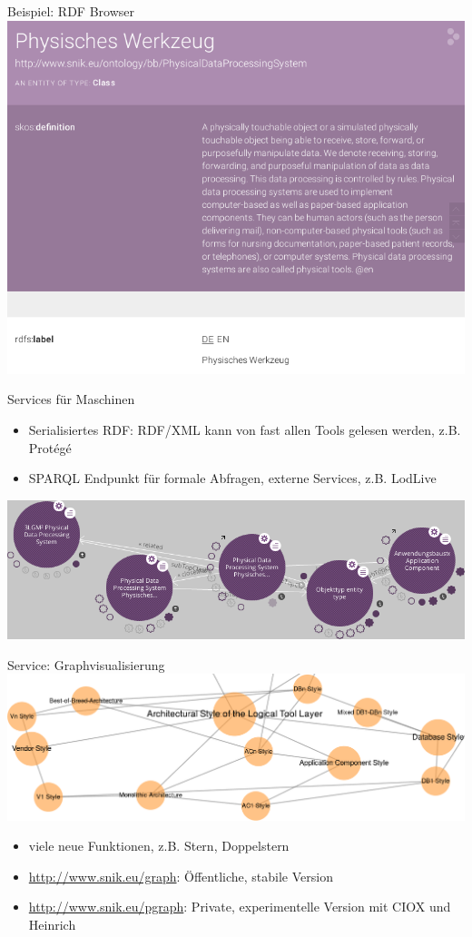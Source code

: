 \documentclass{beamer}
\begin{document}
\begin{frame}{Beispiel: RDF Browser}
\centering\includegraphics[height=0.8\textheight]{img/browse.png}
\end{frame}

\begin{frame}{Services für Maschinen}
\begin{itemize}
\item Serialisiertes RDF: RDF/XML kann von fast allen Tools gelesen werden, z.B. Protégé
\item SPARQL Endpunkt für formale Abfragen, externe Services, z.B. LodLive   
\end{itemize}
\includegraphics[width=\textwidth]{img/lodlive.png}
\end{frame}


\begin{frame}{Service: Graphvisualisierung}
\includegraphics[width=\textwidth]{img/graph.png}
\begin{itemize}
\item viele neue Funktionen, z.B. Stern, Doppelstern 
\item \url{http://www.snik.eu/graph}: Öffentliche, stabile Version
\item \url{http://www.snik.eu/pgraph}: Private, experimentelle Version mit CIOX und Heinrich 
\end{itemize}
\end{frame}
\end{document}
